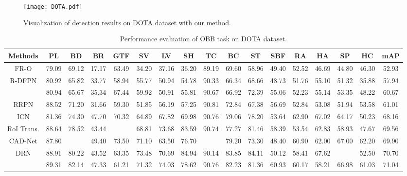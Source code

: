 \documentclass[journal]{IEEEtran}
\begin{document}
\begin{figure*}[t]
	\centering
	\texttt{[image: DOTA.pdf]} 
	\caption{Visualization of detection results on DOTA dataset with our method.}
	\label{Fig11}
\end{figure*}


\begin{table*}[t]
	\renewcommand\arraystretch{1.2}
	\centering
	\caption{  Performance evaluation of OBB task on DOTA dataset.}
	\setlength{\tabcolsep}{1.5mm}
	{
	\begin{tabular}{c|ccccccccccccccc|c}
		\toprule
		Methods   & PL & BD & BR & GTF & SV & LV & SH & TC & BC & ST & SBF & RA & HA & SP & HC & mAP \\ 
		\midrule
		FR-O\cite{xia2018dota}                         & 79.09  &69.12  &17.17  &63.49   &34.20  &37.16  &36.20  &89.19  &69.60  &58.96  &49.40  &52.52  &46.69  &44.80  &46.30  &52.93\\ 
		R-DFPN\cite{yang2018automatic}                  & 80.92  &65.82  &33.77  &58.94   &55.77  &50.94  &54.78  &90.33  &66.34  &68.66  &48.73  &51.76  &55.10  &51.32  &35.88  &57.94 \\
		\cite{jiang2017r2cnn}     & 80.94  &65.67  &35.34  &67.44   &59.92  &50.91  &55.81  &90.67  &66.92  &72.39  &55.06  &52.23  &55.14  &53.35  &48.22  &60.67 \\ 
		RRPN\cite{ma2018arbitrary}	                    & 88.52  &71.20  &31.66  &59.30   &51.85  &56.19  &57.25  &90.81  &72.84  &67.38  &56.69  &52.84  &53.08  &51.94  &53.58  &61.01\\ 
		ICN\cite{azimi2018towards} 	                   & 81.36  &74.30  &47.70  &70.32   &64.89  &67.82  &69.98  &90.76  &79.06  &78.20  &53.64  &62.90  &67.02  &64.17  &50.23  &68.16\\
		RoI Trans.\cite{ding2019learning}                 & 88.64  &78.52  &43.44  &   &68.81  &73.68  &83.59  &90.74  &77.27  &81.46  &58.39  &53.54  &62.83  &58.93  &47.67  &69.56\\
		CAD-Net\cite{zhang2019cad}                      & 87.80  &  &49.40  &73.50   &71.10  &63.50  &76.70  &  &79.20  &73.30  &48.40  &60.90  &62.00  &67.00  &62.20  &69.90 \\ 
		DRN\cite{pan2020dynamic}                      & 88.91  &80.22  &43.52  &63.35   &73.48  &70.69  &84.94  &90.14  &83.85  &84.11  &50.12  &58.41  &67.62  &  &52.50  &70.70  \\ 
		\cite{wei2020oriented}   & 89.31  &82.14  &47.33  &61.21   &71.32  &74.03  &78.62  &90.76  &82.23  &81.36  &60.93  &60.17  &58.21  &66.98  &61.03  &71.04\\

\end{tabular}}
\end{table*}
\end{document}
